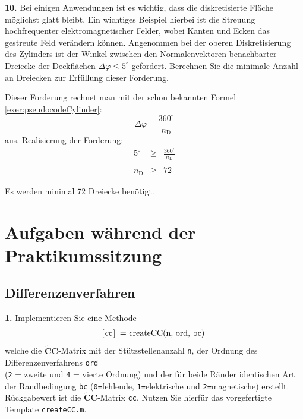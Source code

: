 \documentclass[Protokollheft.tex]{subfiles}
\begin{document}
	\begin{framed}
		\noindent \textbf{10.} Bei einigen Anwendungen ist es wichtig, dass die diskretisierte Fläche möglichst glatt bleibt. Ein
		wichtiges Beispiel hierbei ist die Streuung hochfrequenter elektromagnetischer Felder, wobei
		Kanten und Ecken das gestreute Feld verändern können. Angenommen bei der oberen
		Diskretisierung des Zylinders ist der Winkel zwischen den Normalenvektoren benachbarter Dreiecke der Deckflächen $\Delta \varphi \leq 5^{\circ}$ gefordert.
		Berechnen Sie die minimale Anzahl an Dreiecken zur Erfüllung dieser Forderung.\label{exer:smoothArea}
	\end{framed}
	\noindent
	Dieser Forderung rechnet man mit der schon bekannten Formel
	\ref{exer:pseudocodeCylinder}:
	$$\Delta \varphi = \frac{360^\circ}{n_\text{D}}$$ aus. 
	Realisierung der Forderung:
	\begin{eqnarray*}
		5^{\circ} &\geq& \frac{360^\circ}{n_\text{D}}\\
		\\
		n_\text{D} &\geq& 72
	\end{eqnarray*}
	
	Es werden minimal 72 Dreiecke benötigt.
	
	\section{Aufgaben während der Praktikumssitzung}
	{\subsection{Differenzenverfahren}}
	
	\begin{framed}
		\noindent \textbf{1.} Implementieren Sie eine Methode
		\begin{align}
			\lstinline{[cc] = createCC(n, ord, bc)}\; \label{meth:createCC}
		\end{align}     
		welche die $\tilde{\textbf{C}}\textbf{C}$-Matrix mit der Stützstellenanzahl \lstinline{n}, der Ordnung des Differenzenverfahrens
		\lstinline{ord}\\ (\lstinline{2} = zweite und \lstinline{4} = vierte Ordnung) und der für beide Ränder identischen Art der Randbedingung \lstinline{bc} (\lstinline{0=}fehlende, \lstinline{1=}elektrische und  \lstinline{2=}magnetische) erstellt.
		Rückgabewert ist die $\tilde{\textbf{C}}\textbf{C}$-Matrix \lstinline{cc}. Nutzen Sie hierfür das vorgefertigte Template \lstinline{createCC.m}.\label{exer:createCC}
	\end{framed}
	
\end{document}
